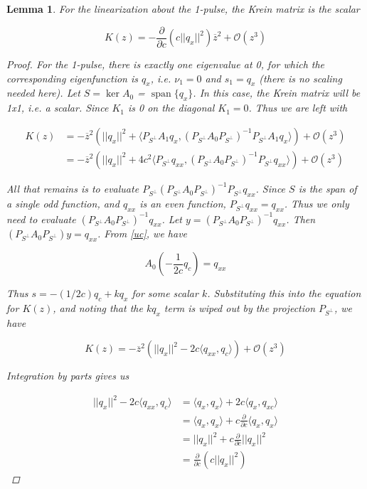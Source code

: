 \documentclass[12pt]{article}
\DeclareMathOperator{\spn}{span}
\newtheorem{lemma}{Lemma}
\begin{document}
\begin{lemma}\label{Krein1pulse}
For the linearization about the 1-pulse, the Krein matrix is the scalar

\begin{equation}
K(z) = -\frac{\partial}{\partial c} \left( c||q_x||^2 \right) \overline{z}^2 + \mathcal{O}(z^3)
\end{equation}

\begin{proof}

For the 1-pulse, there is exactly one eigenvalue at 0, for which the corresponding eigenfunction is $q_x$, i.e. $\nu_1 = 0$ and $s_1 = q_x$ (there is no scaling needed here). Let $S = \ker A_0$ = $\spn \{q_x\}$. In this case, the Krein matrix will be 1x1, i.e. a scalar. Since $K_1$ is 0 on the diagonal $K_1 = 0$. Thus we are left with

\begin{align*}
K(z) &= -\overline{z}^2 \left( ||q_x||^2 + \langle P_{S^\perp} A_1 q_x, (P_{S^\perp} A_0 P_{S^\perp})^{-1} P_{S^\perp} A_1 q_x \rangle \right) + \mathcal{O}(z^3) \\
&= -\overline{z}^2 \left( ||q_x||^2 + 4 c^2 \langle P_{S^\perp} q_{xx}, (P_{S^\perp} A_0 P_{S^\perp})^{-1} P_{S^\perp} q_{xx} \rangle \right) + \mathcal{O}(z^3)
\end{align*}

All that remains is to evaluate $P_{S^\perp} (P_{S^\perp} A_0 P_{S^\perp})^{-1} P_{S^\perp} q_{xx}$. Since $S$ is the span of a single odd function, and $q_{xx}$ is an even function, $P_{S^\perp} q_{xx} = q_{xx}$. Thus we only need to evaluate $(P_{S^\perp} A_0 P_{S^\perp})^{-1} q_{xx}$. Let $y = (P_{S^\perp} A_0 P_{S^\perp})^{-1} q_{xx}$. Then $(P_{S^\perp} A_0 P_{S^\perp})y = q_{xx}$. From \eqref{uc}, we have

\begin{equation*}\label{uc}
A_0 \left( -\frac{1}{2c} q_c \right) = q_{xx}
\end{equation*}

Thus $s = -(1/2c) q_c + k q_x$ for some scalar $k$. Substituting this into the equation for $K(z)$, and noting that the $k q_x$ term is wiped out by the projection $P_{S^\perp}$, we have

\[
K(z) = -\overline{z}^2 \left( ||q_x||^2 - 2c \langle q_{xx}, q_c \rangle \right) + \mathcal{O}(z^3)
\]

Integration by parts gives us

\begin{align*}
||q_x||^2 - 2c \langle q_{xx}, q_c \rangle &= \langle q_x, q_x \rangle + 2c \langle q_{x}, q_{xc} \rangle  \\
&= \langle q_x, q_x \rangle + c \frac{\partial}{\partial c}\langle q_x, q_x \rangle \\
&= ||q_x||^2 + c \frac{\partial}{\partial c}||q_x||^2 \\
&= \frac{\partial}{\partial c} \left( c||q_x||^2 \right)
\end{align*}


\end{proof}
\end{lemma}
\end{document}
